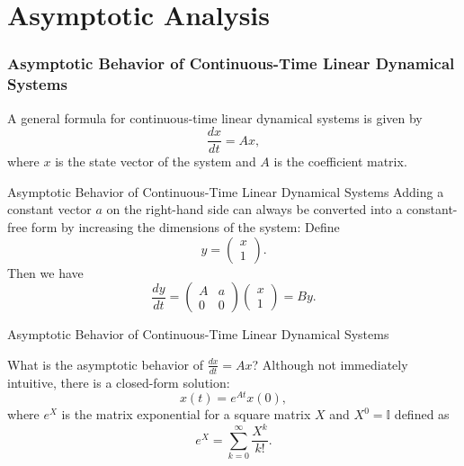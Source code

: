\documentclass{beamer}
\begin{document}
\section{Asymptotic Analysis}
\begin{frame}
\frametitle{Asymptotic Behavior of Continuous-Time Linear Dynamical Systems}
A general formula for continuous-time linear dynamical systems is given by
\begin{equation}
\frac{dx}{dt} = A x,
\end{equation}
where $x$ is the state vector of the system and $A$ is the coefficient matrix.
\end{frame}
\begin{frame}{Asymptotic Behavior of Continuous-Time Linear Dynamical Systems}
Adding a constant vector $a$ on the right-hand side can always be converted into a constant-free form by increasing the dimensions of the system: Define
\begin{equation}
y = \begin{pmatrix} x \\[6pt] 1 \end{pmatrix}.
\end{equation}
Then we have
\begin{equation}
\frac{dy}{dt} = \begin{pmatrix} A & a \\[6pt] 0 & 0 \end{pmatrix}
\begin{pmatrix} x \\[6pt] 1 \end{pmatrix} = B y.
\end{equation}
\end{frame}
\begin{frame}{Asymptotic Behavior of Continuous-Time Linear Dynamical Systems}

What is the asymptotic behavior of $\frac{dx}{dt} = A x$? Although not immediately intuitive, there is a closed-form solution:
\begin{equation}
x(t) = e^{A t} x(0),
\end{equation}
where $e^{X}$ is the matrix exponential for a square matrix $X$ and $X^0=\mathbb{I}$ defined as
\begin{equation}
e^{X} = \sum_{k=0}^{\infty} \frac{X^{k}}{k!}.
\end{equation}

\end{frame}
\end{document}
